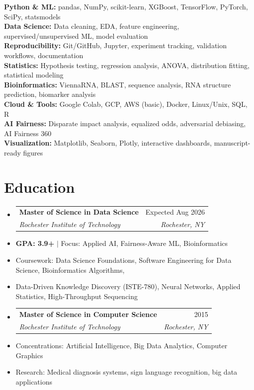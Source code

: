 \documentclass[10pt]{article}
\makeatletter
\newcommand{\resumeItem}[1]{\item\small{#1}}
\newcommand{\resumeSubheading}[4]{
  \vspace{-1pt}\item
  \begin{tabular*}{0.97\textwidth}[t]{l@{\extracolsep{\fill}}r}
    \textbf{#1} & #2 \\
    \textit{\small#3} & \textit{\small #4} \\
  \end{tabular*}\vspace{-5pt}
}
\makeatother
\begin{document}
\textbf{Python \& ML:} pandas, NumPy, scikit-learn, XGBoost, TensorFlow, PyTorch, SciPy, statsmodels \\
\textbf{Data Science:} Data cleaning, EDA, feature engineering, supervised/unsupervised ML, model evaluation \\
\textbf{Reproducibility:} Git/GitHub, Jupyter, experiment tracking, validation workflows, documentation \\
\textbf{Statistics:} Hypothesis testing, regression analysis, ANOVA, distribution fitting, statistical modeling \\
\textbf{Bioinformatics:} ViennaRNA, BLAST, sequence analysis, RNA structure prediction, biomarker analysis \\
\textbf{Cloud \& Tools:} Google Colab, GCP, AWS (basic), Docker, Linux/Unix, SQL, R \\
\textbf{AI Fairness:} Disparate impact analysis, equalized odds, adversarial debiasing, AI Fairness 360 \\
\textbf{Visualization:} Matplotlib, Seaborn, Plotly, interactive dashboards, manuscript-ready figures


\section{Education}

\begin{itemize}[leftmargin=*,label={}]
  \resumeSubheading
    {Master of Science in Data Science}{Expected Aug 2026}
    {Rochester Institute of Technology}{Rochester, NY}
    \resumeItem{\textbf{GPA: 3.9+} $|$ Focus: Applied AI, Fairness-Aware ML, Bioinformatics}
    \resumeItem{Coursework: Data Science Foundations, Software Engineering for Data Science, Bioinformatics Algorithms,}
    \resumeItem{\hspace{10pt}Data-Driven Knowledge Discovery (ISTE-780), Neural Networks, Applied Statistics, High-Throughput Sequencing}

  \vspace{4pt}
  \resumeSubheading
    {Master of Science in Computer Science}{2015}
    {Rochester Institute of Technology}{Rochester, NY}
    \resumeItem{Concentrations: Artificial Intelligence, Big Data Analytics, Computer Graphics}
    \resumeItem{Research: Medical diagnosis systems, sign language recognition, big data applications}
\end{itemize}
\end{document}
